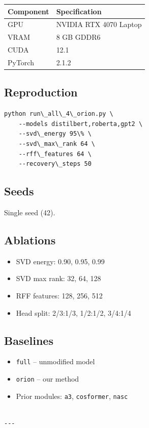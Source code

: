 \begin{table}[H]
\centering
\small
\begin{tabular}{ll}
\toprule
\textbf{Component} & \textbf{Specification} \\
\midrule
GPU & NVIDIA RTX 4070 Laptop \\
VRAM & 8 GB GDDR6 \\
CUDA & 12.1 \\
PyTorch & 2.1.2 \\
\bottomrule
\end{tabular}
\end{table}

\subsection{Reproduction}

\begin{lstlisting}
python run\_all\_4\_orion.py \
    --models distilbert,roberta,gpt2 \
    --svd\_energy 95\% \
    --svd\_max\_rank 64 \
    --rff\_features 64 \
    --recovery\_steps 50
\end{lstlisting}

\subsection{Seeds}

Single seed (42).

\subsection{Ablations}

\begin{itemize}
\item SVD energy: 0.90, 0.95, 0.99
\item SVD max rank: 32, 64, 128
\item RFF features: 128, 256, 512
\item Head split: 2/3:1/3, 1/2:1/2, 3/4:1/4

\end{itemize}
\subsection{Baselines}

\begin{itemize}
\item \texttt{full} -- unmodified model
\item \texttt{orion} -- our method
\item Prior modules: \texttt{a3}, \texttt{cosformer}, \texttt{nasc}
\end{itemize}
\begin{lstlisting}

---
\end{lstlisting}